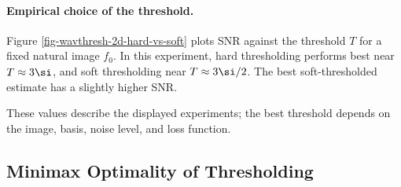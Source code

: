   
\paragraph{Empirical choice of the threshold.}

Figure \ref{fig-wavthresh-2d-hard-vs-soft} plots SNR against the threshold $T$ for a fixed natural image $f_0$. In this experiment, hard thresholding performs best near $T \approx 3\si$, and soft thresholding near $T\approx 3\si/2$. The best soft-thresholded estimate has a slightly higher SNR.


These values describe the displayed experiments; the best threshold depends on the image, basis, noise level, and loss function.


                                                     
\subsection{Minimax Optimality of Thresholding}
\label{subsec-minimax-denoise}

  
\p